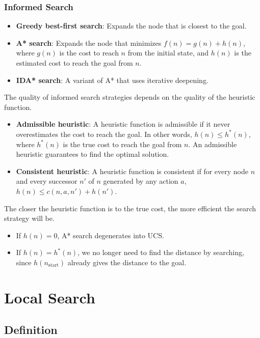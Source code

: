 \documentclass[a4paper,12pt]{article}
\begin{document}
\subsubsection{Informed Search}

\begin{itemize}
  \item \textbf{Greedy best-first search}: Expands the node that is closest to the goal.
  \item \textbf{A* search}: Expands the node that minimizes $f(n) = g(n) + h(n)$, where $g(n)$ is the cost to reach $n$ from the initial state, and $h(n)$ is the estimated cost to reach the goal from $n$.
  \item \textbf{IDA* search}: A variant of A* that uses iterative deepening.
\end{itemize}

The quality of informed search strategies depends on the quality of the heuristic function. 
\begin{itemize}
  \item \textbf{Admissible heuristic}: A heuristic function is admissible if it never overestimates the cost to reach the goal. In other words, $h(n) \leq h^*(n)$, where $h^*(n)$ is the true cost to reach the goal from $n$. An admissible heuristic guarantees to find the optimal solution.
  \item \textbf{Consistent heuristic}: A heuristic function is consistent if for every node $n$ and every successor $n'$ of $n$ generated by any action $a$, $h(n) \leq c(n, a, n') + h(n')$.
\end{itemize}

\begin{tipsbox}
  The closer the heuristic function is to the true cost, the more efficient the search strategy will be.
  \begin{itemize}
    \item If $h(n) = 0$, A* search degenerates into UCS.
    \item If $h(n) = h^*(n)$, we no longer need to find the distance by searching, since $h(n_{\text{start}})$ already gives the distance to the goal.
  \end{itemize}
\end{tipsbox}

\section{Local Search}

\subsection{Definition}
\end{document}

